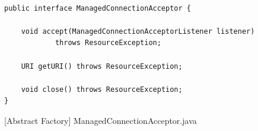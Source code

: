 \begin{figure}[htb]
\centering
\lstset{language=Java, basicstyle=\scriptsize, stepnumber=1, showspaces=false, showstringspaces=false,breaklines=true}
\begin{lstlisting}

public interface ManagedConnectionAcceptor {

    void accept(ManagedConnectionAcceptorListener listener)
            throws ResourceException;

    URI getURI() throws ResourceException;
    
    void close() throws ResourceException;
}
\end{lstlisting}
\caption{[Abstract Factory] ManagedConnectionAcceptor.java}
\label{fig:ManagedConnectionAcceptor}
\end{figure}
\FloatBarrier